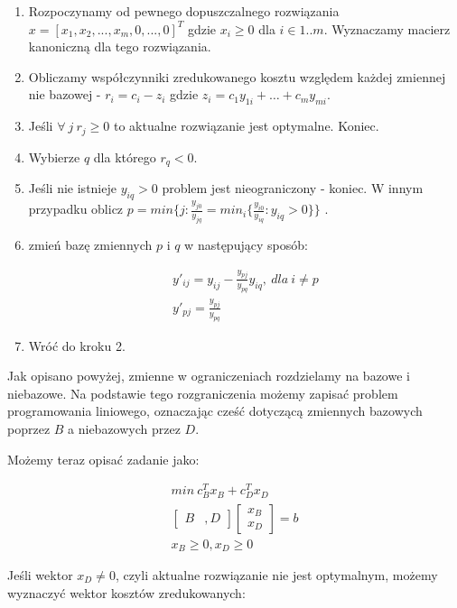 \documentclass{classrep}
\begin{document}
\begin{enumerate}
\item Rozpoczynamy od pewnego dopuszczalnego rozwiązania  $x= \left[ x_1, x_2,...,x_m,0,...,0 \right]^T$ gdzie $x_i \geq 0 $ dla $i \in 1..m$. Wyznaczamy macierz kanoniczną dla tego rozwiązania.
\item Obliczamy współczynniki zredukowanego kosztu względem każdej zmiennej nie bazowej -  $r_i = c_i - z_i $ gdzie $z_i = c_1 y_{1i}+ \dots + c_m y_{mi}$.
\item Jeśli $\forall\ j\ r_j \geq 0$ to aktualne rozwiązanie jest optymalne. Koniec.
\item Wybierze $q$ dla którego $r_q  < 0$.
\item Jeśli  nie istnieje $y_{iq} >0$ problem jest nieograniczony - koniec. W innym przypadku oblicz $p = min \{ j : \frac{y_{j0}}{y_{jq}} = min_i \{ \frac{y_{i0}}{y_{iq}} : y_{iq} > 0 \} \}$ .
\item zmień bazę zmiennych $p$ i $q$ w następujący sposób:

\begin{align}
y'_{ij} = y_{ij} - \frac{y_{pj}}{y_{pq}} y_{iq},\ dla\ i \neq p \nonumber \\
y'_{pj} = \frac{y_{pj}}{y_{pq}}
\end{align}

\item Wróć do kroku 2.
\end{enumerate}

Jak opisano powyżej, zmienne w ograniczeniach rozdzielamy na bazowe i niebazowe. Na podstawie tego rozgraniczenia możemy zapisać problem programowania liniowego, oznaczając cześć dotyczącą zmiennych bazowych poprzez $B$ a niebazowych przez $D$.

Możemy teraz opisać zadanie jako:

\begin{align}
min\ c^{T} _{B} x_{B} + c^{T}_{D}x_{D} \nonumber \\
\left[ \begin{smallmatrix} B &, D \end{smallmatrix} \right] \left[ \begin{smallmatrix} x_B\\x_D \end{smallmatrix} \right] =b  \nonumber \\
x_{B} \geq 0, x_{D} \geq 0
\end{align}

Jeśli wektor $x_D \neq 0$, czyli aktualne rozwiązanie nie jest optymalnym, możemy wyznaczyć wektor kosztów zredukowanych:
\end{document}

